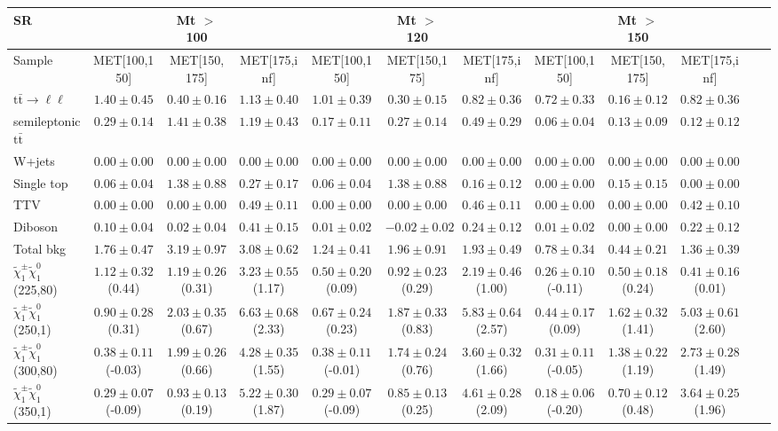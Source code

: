 \begin{table}
\begin{center}
\small
\begin{tabular}{lccccccccccc}
\hline
SR & & Mt $>$ 100 & & & Mt $>$ 120 & & &Mt $>$ 150 & & &\\
\hline
Sample&MET[100,150]&MET[150,175]&MET[175,inf]&MET[100,150]&MET[150,175]&MET[175,inf]&MET[100,150]&MET[150,175]&MET[175,inf]&\\
\hline
$\mathrm{t}\bar{\mathrm{t}}\rightarrow \ell\ell$&$1.40\pm0.45$&$0.40\pm0.16$&$1.13\pm0.40$&$1.01\pm0.39$&$0.30\pm0.15$&$0.82\pm0.36$&$0.72\pm0.33$&$0.16\pm0.12$&$0.82\pm0.36$\\
semileptonic $\mathrm{t}\bar{\mathrm{t}}$&$0.29\pm0.14$&$1.41\pm0.38$&$1.19\pm0.43$&$0.17\pm0.11$&$0.27\pm0.14$&$0.49\pm0.29$&$0.06\pm0.04$&$0.13\pm0.09$&$0.12\pm0.12$\\
W+jets&$0.00\pm0.00$&$0.00\pm0.00$&$0.00\pm0.00$&$0.00\pm0.00$&$0.00\pm0.00$&$0.00\pm0.00$&$0.00\pm0.00$&$0.00\pm0.00$&$0.00\pm0.00$\\
Single top&$0.06\pm0.04$&$1.38\pm0.88$&$0.27\pm0.17$&$0.06\pm0.04$&$1.38\pm0.88$&$0.16\pm0.12$&$0.00\pm0.00$&$0.15\pm0.15$&$0.00\pm0.00$\\
TTV&$0.00\pm0.00$&$0.00\pm0.00$&$0.49\pm0.11$&$0.00\pm0.00$&$0.00\pm0.00$&$0.46\pm0.11$&$0.00\pm0.00$&$0.00\pm0.00$&$0.42\pm0.10$\\
Diboson&$0.10\pm0.04$&$0.02\pm0.04$&$0.41\pm0.15$&$0.01\pm0.02$&$-0.02\pm0.02$&$0.24\pm0.12$&$0.01\pm0.02$&$0.00\pm0.00$&$0.22\pm0.12$\\
\hline
Total bkg&$1.76\pm0.47$&$3.19\pm0.97$&$3.08\pm0.62$&$1.24\pm0.41$&$1.96\pm0.91$&$1.93\pm0.49$&$0.78\pm0.34$&$0.44\pm0.21$&$1.36\pm0.39$\\
$\tilde{\chi}_{1}^{\pm}\tilde{\chi}_{1}^{0}$ (225,80)&$1.12\pm0.32$(0.44)&$1.19\pm0.26$(0.31)&$3.23\pm0.55$(1.17)&$0.50\pm0.20$(0.09)&$0.92\pm0.23$(0.29)&$2.19\pm0.46$(1.00)&$0.26\pm0.10$(-0.11)&$0.50\pm0.18$(0.24)&$0.41\pm0.16$(0.01)\\
$\tilde{\chi}_{1}^{\pm}\tilde{\chi}_{1}^{0}$ (250,1)&$0.90\pm0.28$(0.31)&$2.03\pm0.35$(0.67)&$6.63\pm0.68$(2.33)&$0.67\pm0.24$(0.23)&$1.87\pm0.33$(0.83)&$5.83\pm0.64$(2.57)&$0.44\pm0.17$(0.09)&$1.62\pm0.32$(1.41)&$5.03\pm0.61$(2.60)\\
$\tilde{\chi}_{1}^{\pm}\tilde{\chi}_{1}^{0}$ (300,80)&$0.38\pm0.11$(-0.03)&$1.99\pm0.26$(0.66)&$4.28\pm0.35$(1.55)&$0.38\pm0.11$(-0.01)&$1.74\pm0.24$(0.76)&$3.60\pm0.32$(1.66)&$0.31\pm0.11$(-0.05)&$1.38\pm0.22$(1.19)&$2.73\pm0.28$(1.49)\\
$\tilde{\chi}_{1}^{\pm}\tilde{\chi}_{1}^{0}$ (350,1)&$0.29\pm0.07$(-0.09)&$0.93\pm0.13$(0.19)&$5.22\pm0.30$(1.87)&$0.29\pm0.07$(-0.09)&$0.85\pm0.13$(0.25)&$4.61\pm0.28$(2.09)&$0.18\pm0.06$(-0.20)&$0.70\pm0.12$(0.48)&$3.64\pm0.25$(1.96)\\
\hline
\hline\hline
\end{tabular}
\end{center}
\end{table}
